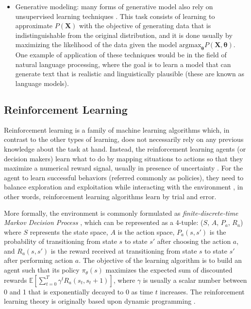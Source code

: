 \begin{itemize}
	\item Generative modeling: many forms of generative model also rely on unsupervised learning techniques \cite{bishop2006}. This task consists of learning to approximate $P(\mathbf{X})$ with the objective of generating data that is indistinguishable from the original distribution, and it is done usually by maximizing the likelihood of the data given the model $\mathrm{argmax}_\mathbf{\theta} P(\mathbf{\mathbf{X},\mathbf{\theta}})$.  One example of application of these techniques would be in the field of natural language processing, where the goal is to learn a model that can generate text \cite{uday2019} that is realistic and linguistically plausible (these are known as language models). 
\end{itemize}


\subsection{Reinforcement Learning}
Reinforcement learning is a family of machine learning algorithms which, in contrast to the other types of learning, does not necessarily rely on any previous knowledge about the task at hand. Instead, the reinforcement learning agents (or decision makers) learn what to do by mapping situations to actions \cite{sutton2018} so that they maximize a numerical reward signal, usually in presence of uncertainty \cite{haykin1998}. For the agent to learn successful behaviors (referred commonly as policies), they need to balance exploration and exploitation while interacting with the environment \cite{sutton2018}, in other words, reinforcement learning algorithms learn by trial and error. 

More formally, the environment is commonly formulated as \textit{finite-discrete-time Markov Decision Process} \cite{haykin1998}, which can be represented as a 4-tuple: ($S$, $A$, $P_a$, $R_a$) where $S$ represents the state space, $A$ is the action space, $P_a(s, s')$ is the probability of transitioning from state $s$ to state $s'$ after choosing the action $a$, and $R_a(s, s')$ is the reward received at transitioning from state $s$ to state $s'$ after performing action $a$. The objective of the learning algorithm is to build an agent such that its policy $\pi_\theta(s)$ maximizes the expected sum of discounted rewards $\mathbb{E} \left[ \sum_{t=0}^{T} \gamma^t R_a(s_t, s_t+1) \right]$, where $\gamma$ is usually a scalar number between 0 and 1 that is exponentially decayed to 0 as time $t$ increases. The reinforcement learning theory is originally based upon dynamic programming \cite{szepesvari2010}. 

